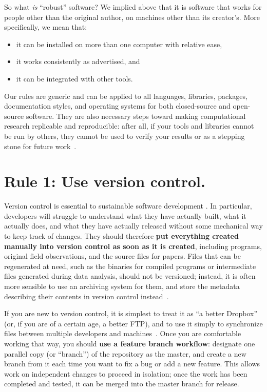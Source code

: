 \documentclass[10pt,letterpaper]{article}
\newcommand{\rulemajor}[1]{\section*{#1}}
\newcommand{\ruleminor}[1]{\textbf{#1}}
\begin{document}
So what \emph{is} ``robust'' software?  We implied above that it is
software that works for people other than the original author, on
machines other than its creator's.  More specifically, we mean that:

\begin{itemize}

\item
  it can be installed on more than one computer with relative ease,

\item
  it works consistently as advertised, and

\item
  it can be integrated with other tools.

\end{itemize}

Our rules are generic and can be applied to all languages, libraries,
packages, documentation styles, and operating systems for both
closed-source and open-source software.  They are also necessary steps
toward making computational research replicable and reproducible:
after all, if your tools and libraries cannot be run by others, they
cannot be used to verify your results or as a stepping stone for
future work~\cite{brown2013}.

\rulemajor{Rule 1: Use version control.}

Version control is essential to sustainable software development
\cite{wilson2014,wilson2016}.  In particular, developers will struggle
to understand what they have actually built, what it actually does,
and what they have actually released without some mechanical way to
keep track of changes.  They should therefore \ruleminor{put
everything created manually into version control as soon as it is
created}, including programs, original field observations, and the
source files for papers.  Files that can be regenerated at need, such
as the binaries for compiled programs or intermediate files generated
during data analysis, should not be versioned; instead, it is often
more sensible to use an archiving system for them, and store the
metadata describing their contents in version control
instead~\cite{noble2009}.

If you are new to version control, it is simplest to treat it as ``a
better Dropbox'' (or, if you are of a
certain age, a better FTP), and to use it simply to synchronize files
between multiple developers and machines~\cite{blischak2016}.  Once
you are comfortable working that way, you should \ruleminor{use a
feature branch workflow}: designate one parallel copy (or
``branch'') of the repository as the master, and create a new branch
from it each time you want to fix a bug or add a new feature.  This
allows work on independent changes to proceed in isolation; once the
work has been completed and tested, it can be merged into the master
branch for release.
\end{document}
